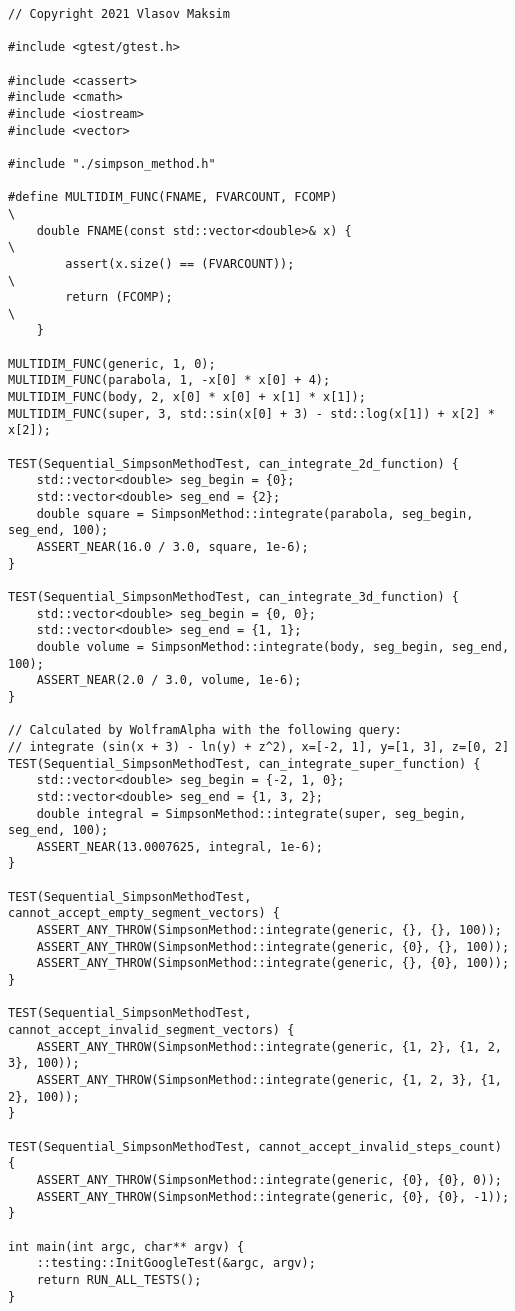 \documentclass{report}
\begin{document}
\begin{lstlisting}
// Copyright 2021 Vlasov Maksim

#include <gtest/gtest.h>

#include <cassert>
#include <cmath>
#include <iostream>
#include <vector>

#include "./simpson_method.h"

#define MULTIDIM_FUNC(FNAME, FVARCOUNT, FCOMP)                                 \
    double FNAME(const std::vector<double>& x) {                               \
        assert(x.size() == (FVARCOUNT));                                       \
        return (FCOMP);                                                        \
    }

MULTIDIM_FUNC(generic, 1, 0);
MULTIDIM_FUNC(parabola, 1, -x[0] * x[0] + 4);
MULTIDIM_FUNC(body, 2, x[0] * x[0] + x[1] * x[1]);
MULTIDIM_FUNC(super, 3, std::sin(x[0] + 3) - std::log(x[1]) + x[2] * x[2]);

TEST(Sequential_SimpsonMethodTest, can_integrate_2d_function) {
    std::vector<double> seg_begin = {0};
    std::vector<double> seg_end = {2};
    double square = SimpsonMethod::integrate(parabola, seg_begin, seg_end, 100);
    ASSERT_NEAR(16.0 / 3.0, square, 1e-6);
}

TEST(Sequential_SimpsonMethodTest, can_integrate_3d_function) {
    std::vector<double> seg_begin = {0, 0};
    std::vector<double> seg_end = {1, 1};
    double volume = SimpsonMethod::integrate(body, seg_begin, seg_end, 100);
    ASSERT_NEAR(2.0 / 3.0, volume, 1e-6);
}

// Calculated by WolframAlpha with the following query:
// integrate (sin(x + 3) - ln(y) + z^2), x=[-2, 1], y=[1, 3], z=[0, 2]
TEST(Sequential_SimpsonMethodTest, can_integrate_super_function) {
    std::vector<double> seg_begin = {-2, 1, 0};
    std::vector<double> seg_end = {1, 3, 2};
    double integral = SimpsonMethod::integrate(super, seg_begin, seg_end, 100);
    ASSERT_NEAR(13.0007625, integral, 1e-6);
}

TEST(Sequential_SimpsonMethodTest, cannot_accept_empty_segment_vectors) {
    ASSERT_ANY_THROW(SimpsonMethod::integrate(generic, {}, {}, 100));
    ASSERT_ANY_THROW(SimpsonMethod::integrate(generic, {0}, {}, 100));
    ASSERT_ANY_THROW(SimpsonMethod::integrate(generic, {}, {0}, 100));
}

TEST(Sequential_SimpsonMethodTest, cannot_accept_invalid_segment_vectors) {
    ASSERT_ANY_THROW(SimpsonMethod::integrate(generic, {1, 2}, {1, 2, 3}, 100));
    ASSERT_ANY_THROW(SimpsonMethod::integrate(generic, {1, 2, 3}, {1, 2}, 100));
}

TEST(Sequential_SimpsonMethodTest, cannot_accept_invalid_steps_count) {
    ASSERT_ANY_THROW(SimpsonMethod::integrate(generic, {0}, {0}, 0));
    ASSERT_ANY_THROW(SimpsonMethod::integrate(generic, {0}, {0}, -1));
}

int main(int argc, char** argv) {
    ::testing::InitGoogleTest(&argc, argv);
    return RUN_ALL_TESTS();
}
\end{lstlisting}
\end{document}
